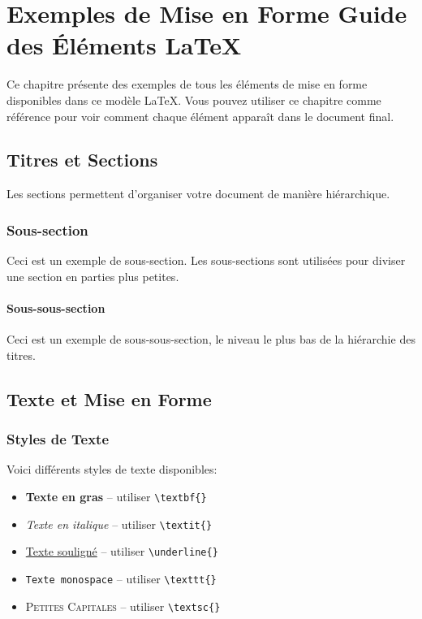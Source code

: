 \chapter[Exemples de Mise en Forme: Guide des Éléments LaTeX]{Exemples de Mise en Forme Guide des Éléments LaTeX}
\label{cp:examples}

Ce chapitre présente des exemples de tous les éléments de mise en forme disponibles dans ce modèle LaTeX. Vous pouvez utiliser ce chapitre comme référence pour voir comment chaque élément apparaît dans le document final.

\section{Titres et Sections}
Les sections permettent d'organiser votre document de manière hiérarchique.

\subsection{Sous-section}
Ceci est un exemple de sous-section. Les sous-sections sont utilisées pour diviser une section en parties plus petites.

\subsubsection{Sous-sous-section}
Ceci est un exemple de sous-sous-section, le niveau le plus bas de la hiérarchie des titres.

\section{Texte et Mise en Forme}

\subsection{Styles de Texte}
Voici différents styles de texte disponibles:

\begin{itemize}
    \item \textbf{Texte en gras} -- utiliser \verb|\textbf{}|
    \item \textit{Texte en italique} -- utiliser \verb|\textit{}|
    \item \underline{Texte souligné} -- utiliser \verb|\underline{}|
    \item \texttt{Texte monospace} -- utiliser \verb|\texttt{}|
    \item \textsc{Petites Capitales} -- utiliser \verb|\textsc{}|
\end{itemize}

